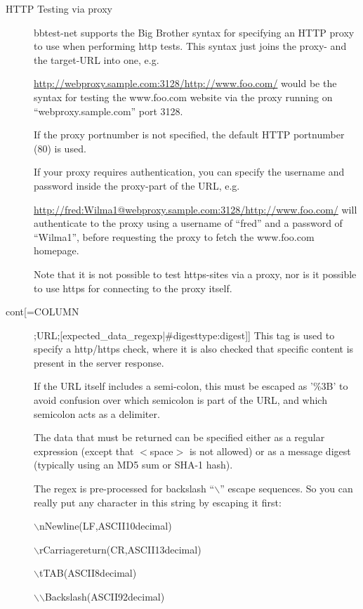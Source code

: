 \begin{description}
\item[HTTP Testing via proxy] bbtest-net supports the Big Brother
  syntax for specifying an HTTP proxy to use when performing http
  tests. This syntax just joins the proxy- and the target-URL into
  one, e.g.  

 
\url{http://webproxy.sample.com:3128/http://www.foo.com/} 
 would be the syntax for testing the www.foo.com website via the proxy
 running on ``webproxy.sample.com'' port 3128. 


  If the proxy portnumber is not specified, the default HTTP portnumber (80) is used. 


  If your proxy requires authentication, you can specify the username and password inside the proxy-part of the URL, e.g.  
 
\url{http://fred:Wilma1@webproxy.sample.com:3128/http://www.foo.com/}
will authenticate to the proxy using a username of ``fred'' and a
password of ``Wilma1'', before requesting the proxy to fetch the
www.foo.com homepage. 



  Note that it is not possible to test https-sites via a proxy, nor is it possible to use https for connecting to the proxy itself. 


\item[cont[=COLUMN];URL;[expected\_data\_regexp|\#digesttype:digest]]
  This tag is used to specify a http/https check, where it is also
  checked that specific content is present in the server response. 


  If the URL itself includes a semi-colon, this must be escaped as
  '\%3B' to avoid confusion over which semicolon is part of the URL,
  and which semicolon acts as a delimiter. 



  The data that must be returned can be specified either as a regular
  expression (except that $<$space$>$ is not allowed) or as a message
  digest (typically using an MD5 sum or SHA-1 hash). 



  The regex is pre-processed for backslash ``$\backslash$'' escape
  sequences. So you can really put any character in this string by
  escaping it first:  

 
$\backslash$nNewline(LF,ASCII10decimal)  
 
$\backslash$rCarriagereturn(CR,ASCII13decimal)  
 
$\backslash$tTAB(ASCII8decimal)  
 
$\backslash$$\backslash$Backslash(ASCII92decimal)  
 

\end{description}
